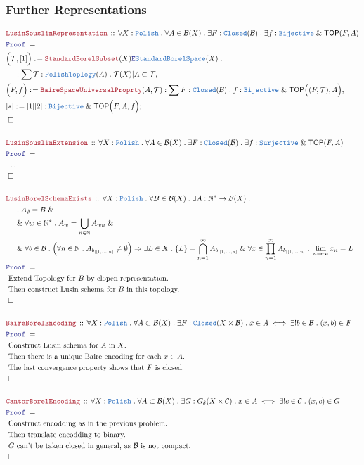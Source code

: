 \documentclass[12pt]{scrartcl}
\newcommand{\TYPE}[1]{\textcolor{NavyBlue}{\mathtt{#1}}}
\newcommand{\LOGIC}[1]{\textcolor{Blue}{\mathtt{#1}}}
\newcommand{\THM}[1]{\textcolor{Maroon}{\mathtt{#1}}}
\renewcommand{\.}{\; . \;}
\newcommand{\de}{: \kern 0.1pc =}
\newcommand{\Theorem}[2]{& \THM{#1} \, :: \, #2 \\ & \Proof = \\ }
\newcommand{\NewLine}{\\ & \kern 1pc}
\newcommand{\Page}[1]{ \begin{align*} #1 \end{align*}   }
\newcommand{\NoProof}{ & \ldots \\ \EndProof}
\renewcommand{\And}{\; \& \;}
\newcommand{\Imply}{\Rightarrow}
\newcommand{\Elim}{\LOGIC{E}}
\newcommand{\Nat}{\mathbb{N} }
\newcommand{\Say}[3]{& #1 \de #2 : #3, \\}
\newcommand{\Conclude}[3]{& #1 \de #2 : #3; \\}
\newcommand{\QED}{\; \square}
\newcommand{\EndProof}{& \QED \\}
\newcommand{\Proof}{\LOGIC{Proof} \; }
\newcommand{\Explain}[1]{& \text{#1.} \\}
\newcommand{\Surj}{\TYPE{Surjective}}
\newcommand{\Bij}{\TYPE{Bijective}}
\newcommand{\C}{\mathcal{C}}
\newcommand{\B}{\mathcal{B}}
\newcommand{\Closed}{\TYPE{Closed}}
\newcommand{\TOP}{\mathsf{TOP}}
\newcommand{\T}{\mathcal{T}}
\newcommand{\FS}[1]{{#1}{}^*}
\newcommand{\Polish}{\TYPE{Polish}}
\newcommand{\SBS}{\TYPE{StandardBorelSpace}}
\newcommand{\inits}[2]{{#1}_{|\left[1,\ldots,#2\right]}}
\begin{document}
\subsubsection{Further Representations}
\Page{
	\Theorem{LusinSouslinRepresentation}
	{
		\forall X : \Polish \.
		\forall A  \in \B(X) \.
		\exists F : \Closed(\B) \.
		\exists f : \Bij \And \TOP(F,A)
	}
	\Say{\Big( \T,[1]\Big)}{\THM{StandardBorelSubset}(X)\Elim \SBS(X)}
	{
		\NewLine :		
		\sum \T : \TYPE{PolishToplogy}(A) \.
		\T(X)|A \subset \T
	}
	\Say{\Big(F,f\Big)}{\THM{BaireSpaceUniversalProprty}(A,\T)}
	{
		\sum F : \Closed(\B) \.
		f : \Bij \And \TOP\Big((F,\T),A\Big)
	}
	\Conclude{[*]}{[1][2]}
	{
		\Bij \And \TOP\Big(F,A,f\Big)
	}
	\EndProof
	\\
	\Theorem{LusinSouslinExtension}
	{
		\forall X : \Polish \.
		\forall A  \in \B(X) \.
		\exists F : \Closed(\B) \.
		\exists f : \Surj \And \TOP(F,A)
	}
	\NoProof
	\\
	\Theorem{LusinBorelSchemaExists}
	{
		\forall X : \Polish \.
		\forall B \in \B(X) \.
		\exists A : \FS{\Nat}  \to \B(X) \. \NewLine \.
		A_\emptyset = B \And \NewLine \And 
		\forall w \in \FS{\Nat} \.
		A_w = \bigcup_{n \in \Nat} A_{w n}  \And \NewLine \And
		\forall b \in \B \.   
		\Big(\forall n \in \Nat \. A_{\inits{b}{n}} \neq \emptyset \Big)
		\Imply
		\exists L \in X \.
		\{ L \} = \bigcap^\infty_{n=1} A_{\inits{b}{n}} 
		\And
		\forall   x \in  \prod^\infty_{n=1} A_{\inits{b}{n}} \.
		\lim_{n \to \infty} x_n = L
	}
	\Explain{ Extend Topology for $B$ by clopen representation}
	\Explain{ Then construct Lusin schema for $B$ in this topology}
	\EndProof
	\\
	\Theorem{BaireBorelEncoding}
	{
		\forall X : \Polish \.
		\forall A \subset \B(X) \.
		\exists F : \Closed(X \times \B) \.
		x \in A
		\iff
		\exists! b \in \B \. (x,b) \in F
	}
	\Explain{ Construct Lusin schema for $A$ in $X$}
	\Explain{ Then there is a unique Baire encoding for each $x \in A$}
	\Explain{ The last convergence property shows that $F$ is closed}
	\EndProof
	\\
	\Theorem{CantorBorelEncoding}
	{
		\forall X : \Polish \.
		\forall A \subset \B(X) \.
		\exists G : G_\delta(X \times \C) \.
		x \in A
		\iff
		\exists! c \in \C \. (x,c) \in G
	}
	\Explain{ Construct encodding as in the previous problem}
	\Explain{ Then translate encodding to binary}
	\Explain{ $G$ can't be taken closed in general, as $\B$ is not compact}
	\EndProof
}
\end{document}
